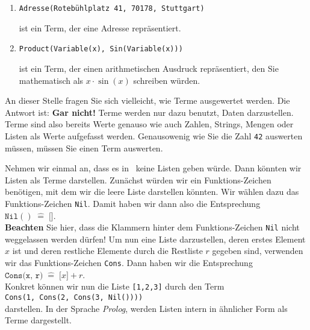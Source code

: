 \examples
\begin{enumerate}
\item \texttt{Adresse(Rotebühlplatz 41, 70178, Stuttgart)}

      ist ein Term, der eine Adresse repräsentiert.
\item \texttt{Product(Variable(x), Sin(Variable(x)))}

      ist ein Term, der einen arithmetischen Ausdruck repräsentiert, den Sie mathematisch
      als $x \cdot \sin(x)$ schreiben würden.  \eox
\end{enumerate}

An dieser Stelle fragen Sie sich vielleicht, wie Terme ausgewertet werden.  Die Antwort ist:
\textbf{Gar nicht!}  Terme werden nur dazu benutzt, Daten darzustellen.  Terme sind also bereits 
Werte  genauso wie auch Zahlen, Strings, Mengen oder Listen als Werte aufgefasst werden.
Genausowenig wie Sie die Zahl \texttt{42} auswerten müssen, müssen Sie einen Term auswerten.

Nehmen wir einmal an,
dass es in \setl\ keine Listen geben würde.  Dann könnten wir Listen als Terme darstellen.  Zunächst
würden wir ein Funktions-Zeichen benötigen, mit dem wir die leere Liste darstellen könnten.  Wir
wählen dazu das Funktions-Zeichen \texttt{Nil}.  Damit haben wir dann also die Entsprechung
\\[0.2cm]
\hspace*{1.3cm}
$\texttt{Nil}() \;\widehat{=}\; \texttt{[]}$.
\\[0.2cm]
\textbf{Beachten} Sie hier, dass die Klammern hinter dem Funktions-Zeichen \texttt{Nil} nicht
weggelassen werden dürfen!  Um nun eine Liste darzustellen, deren erstes Element $x$ ist und deren
restliche Elemente durch die Restliste $r$ gegeben sind, verwenden wir das Funktions-Zeichen
\texttt{Cons}.  Dann haben wir die Entsprechung
\\[0.2cm]
\hspace*{1.3cm}
$\texttt{Cons(x, r)} \;\widehat{=}\; \texttt{[}x\texttt{]}+r$. 
\\[0.2cm]
Konkret können wir nun die Liste \texttt{[1,2,3]} durch den Term
\\[0.2cm]
\hspace*{1.3cm}
\texttt{Cons(1, Cons(2, Cons(3, Nil())))}
\\[0.2cm]
darstellen.  In der Sprache \textsl{Prolog}, werden Listen intern in ähnlicher Form als Terme dargestellt.

